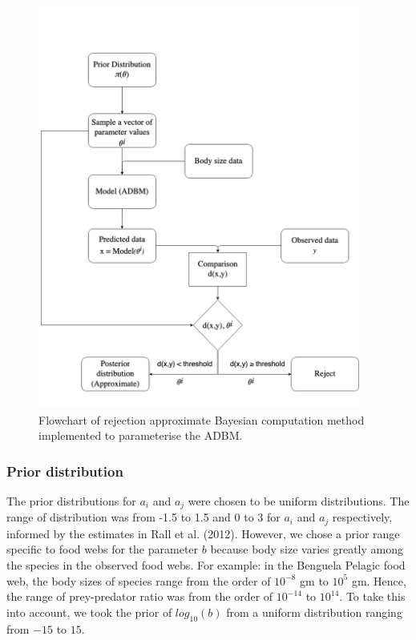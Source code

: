 \documentclass{article}
\begin{document}
\begin{figure}

{\centering \includegraphics[width=400px]{fig/schematic} 

}

\caption{\label{fig:fig_m1} Flowchart of rejection approximate Bayesian computation method implemented to parameterise the ADBM.}\label{fig:unnamed-chunk-3}
\end{figure}

\hypertarget{prior-distribution}{%
\subsubsection{Prior distribution}\label{prior-distribution}}

The prior distributions for \(a_i\) and \(a_j\) were chosen to be
uniform distributions. The range of distribution was from -1.5 to 1.5
and 0 to 3 for \(a_i\) and \(a_j\) respectively, informed by the
estimates in Rall et al. (2012). However, we chose a prior range
specific to food webs for the parameter \(b\) because body size varies
greatly among the species in the observed food webs. For example: in the
Benguela Pelagic food web, the body sizes of species range from the
order of \(10^{-8}\) gm to \(10^5\) gm. Hence, the range of
prey-predator ratio was from the order of \(10^{-14}\) to \(10^{14}\).
To take this into account, we took the prior of \(log_{10}(b)\) from a
uniform distribution ranging from \(-15\) to \(15\).
\end{document}
